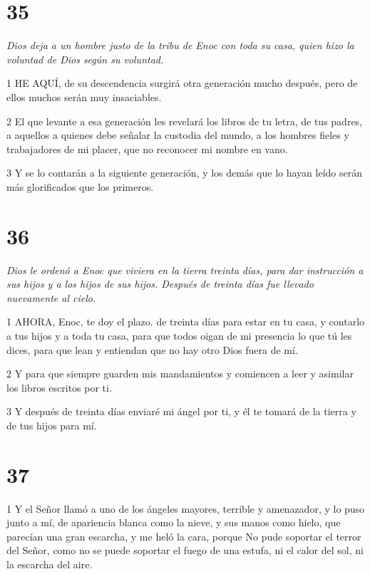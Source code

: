 \chapter{35}

\par \textit{Dios deja a un hombre justo de la tribu de Enoc con toda su casa, quien hizo la voluntad de Dios según su voluntad.}

\par 1 HE AQUÍ, de su descendencia surgirá otra generación mucho después, pero de ellos muchos serán muy insaciables.

\par 2 El que levante a esa generación les revelará los libros de tu letra, de tus padres, a aquellos a quienes debe señalar la custodia del mundo, a los hombres fieles y trabajadores de mi placer, que no reconocer mi nombre en vano.

\par 3 Y se lo contarán a la siguiente generación, y los demás que lo hayan leído serán más glorificados que los primeros.

\chapter{36}

\par \textit{Dios le ordenó a Enoc que viviera en la tierra treinta días, para dar instrucción a sus hijos y a los hijos de sus hijos. Después de treinta días fue llevado nuevamente al cielo.}

\par 1 AHORA, Enoc, te doy el plazo. de treinta días para estar en tu casa, y contarlo a tus hijos y a toda tu casa, para que todos oigan de mi presencia lo que tú les dices, para que lean y entiendan que no hay otro Dios fuera de mí.

\par 2 Y para que siempre guarden mis mandamientos y comiencen a leer y asimilar los libros escritos por ti.

\par 3 Y después de treinta días enviaré mi ángel por ti, y él te tomará de la tierra y de tus hijos para mí.

\chapter{37}

\par 1 Y el Señor llamó a uno de los ángeles mayores, terrible y amenazador, y lo puso junto a mí, de apariencia blanca como la nieve, y sus manos como hielo, que parecían una gran escarcha, y me heló la cara, porque No pude soportar el terror del Señor, como no se puede soportar el fuego de una estufa, ni el calor del sol, ni la escarcha del aire.

